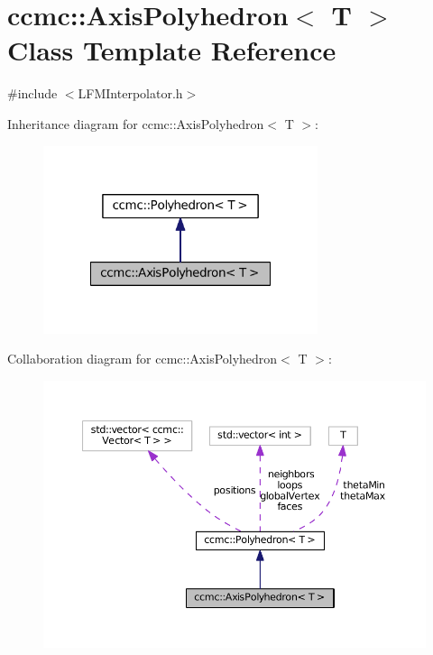 \hypertarget{classccmc_1_1_axis_polyhedron}{\section{ccmc\-:\-:Axis\-Polyhedron$<$ T $>$ Class Template Reference}
\label{classccmc_1_1_axis_polyhedron}
}


{\ttfamily \#include $<$L\-F\-M\-Interpolator.\-h$>$}



Inheritance diagram for ccmc\-:\-:Axis\-Polyhedron$<$ T $>$\-:
\nopagebreak
\begin{figure}[H]
\begin{center}
\leavevmode
\includegraphics[width=228pt]{classccmc_1_1_axis_polyhedron__inherit__graph}
\end{center}
\end{figure}


Collaboration diagram for ccmc\-:\-:Axis\-Polyhedron$<$ T $>$\-:
\nopagebreak
\begin{figure}[H]
\begin{center}
\leavevmode
\includegraphics[width=350pt]{classccmc_1_1_axis_polyhedron__coll__graph}
\end{center}
\end{figure}
